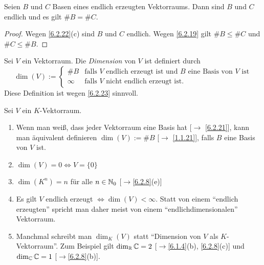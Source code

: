 \documentclass[../../main.tex]{subfiles}
\begin{document}
\begin{sat}\label{6.2.23}
Seien $B$ und $C$ Basen eines endlich erzeugten Vektorraums. Dann sind $B$ und $C$ endlich und es gilt $\#B=\#C$.
\end{sat}
\begin{proof}
Wegen \ref{6.2.22}(c) sind $B$ und $C$ endlich. Wegen \ref{6.2.19} gilt $\#B\le\#C$ und $\#C\le\#B$.
\end{proof}

\begin{df}\label{6.2.24}
Sei $V$ ein Vektorraum. Die \emph{Dimension} von $V$ ist definiert durch
$$\dim(V):=\begin{cases}\#B&\text{falls $V$ endlich erzeugt ist und $B$ eine Basis von $V$ ist}\\\infty&\text{falls $V$ nicht endlich erzeugt ist.}\end{cases}$$
Diese Definition ist wegen \ref{6.2.23} sinnvoll.
\end{df}

\begin{bem}\label{6.2.25} Sei $V$ ein $K$-Vektorraum.
\begin{enumerate}[\normalfont(a)]
\item Wenn man weiß, dass jeder Vektorraum eine Basis hat [$\to$ \ref{6.2.21}], kann man äquivalent definieren $\dim(V):=\#B$ [$\to$ \ref{1.1.21}], falls $B$ eine Basis von $V$ ist.
\item $\dim(V)=0\iff V=\{0\}$
\item $\dim(K^n)=n$ für alle $n\in\mathbb N_0$ [$\to$\ref{6.2.8}(e)]
\item Es gilt $V$ endlich erzeugt $\iff\dim(V)<\infty$. Statt von einem "`endlich erzeugten"' spricht man daher meist von einem "`endlichdimensionalen"' Vektorraum.
\item Manchmal schreibt man $\dim_K(V)$ statt "`Dimension von $V$ als $K$-Vektorraum"'. Zum Beispiel gilt $\dim_\mathbb R\mathbb C=2$ [$\to$\ref{6.1.4}(b), \ref{6.2.8}(c)] und $\dim_\mathbb C\mathbb C=1$
[$\to$\ref{6.2.8}(b)].
\end{enumerate}
\end{bem}
\end{document}
